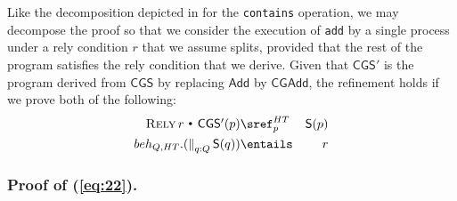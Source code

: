 \documentclass{article}
\makeatletter
\newcommand{\st}{~{\scriptscriptstyle ^\bullet}~}
\def \rely {\mathop{\textsc{Rely}}}
\theoremstyle{plain}
\theoremstyle{definition}
\newcommand{\Rely}[2]
{\rely #1 \st
    \begin{array}[c]{@{}l@{}}
      #2
    \end{array}}
\newcommand{\Par}{\textstyle\mathop{\|}}
\makeatother
\begin{document}
Like the decomposition depicted in  for the
\texttt{contains} operation, we may decompose the proof so that we
consider the execution of \texttt{add} by a single process under a
rely condition $r$ that we assume splits, provided that the rest of
the program satisfies the rely condition that we derive. Given that
$\mathsf{CGS}'$ is the program derived from $\mathsf{CGS}$ by
replacing $\mathsf{Add}$ by $\mathsf{CGAdd}$, the refinement holds if
we prove both of the following:
\begin{eqnarray}
  \label{eq:22}
  \Rely{r}{\mathsf{CGS'}(p)} & \sref_{p}^{HT}  & \mathsf{S}(p) 
  \\
  \label{eq:23}
  beh_{Q,HT}.(\Par_{q : Q} \mathsf{S}(q))  & \entails &  r
\end{eqnarray}

\subsubsection{Proof of (\ref{eq:22}).}
\end{document}
